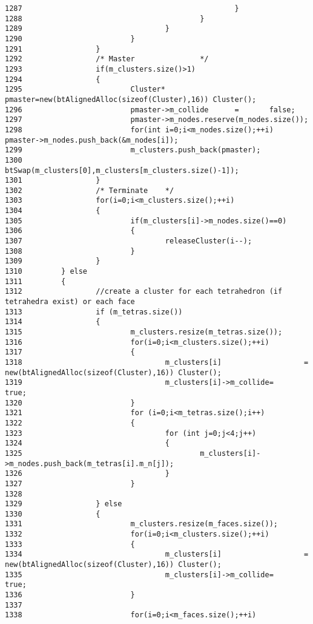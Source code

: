 \begin{Code}
\begin{verbatim}
1287                                                 }
1288                                         }
1289                                 }
1290                         }
1291                 }
1292                 /* Master               */ 
1293                 if(m_clusters.size()>1)
1294                 {
1295                         Cluster*        pmaster=new(btAlignedAlloc(sizeof(Cluster),16)) Cluster();
1296                         pmaster->m_collide      =       false;
1297                         pmaster->m_nodes.reserve(m_nodes.size());
1298                         for(int i=0;i<m_nodes.size();++i) pmaster->m_nodes.push_back(&m_nodes[i]);
1299                         m_clusters.push_back(pmaster);
1300                         btSwap(m_clusters[0],m_clusters[m_clusters.size()-1]);
1301                 }
1302                 /* Terminate    */ 
1303                 for(i=0;i<m_clusters.size();++i)
1304                 {
1305                         if(m_clusters[i]->m_nodes.size()==0)
1306                         {
1307                                 releaseCluster(i--);
1308                         }
1309                 }
1310         } else
1311         {
1312                 //create a cluster for each tetrahedron (if tetrahedra exist) or each face
1313                 if (m_tetras.size())
1314                 {
1315                         m_clusters.resize(m_tetras.size());
1316                         for(i=0;i<m_clusters.size();++i)
1317                         {
1318                                 m_clusters[i]                   =       new(btAlignedAlloc(sizeof(Cluster),16)) Cluster();
1319                                 m_clusters[i]->m_collide=       true;
1320                         }
1321                         for (i=0;i<m_tetras.size();i++)
1322                         {
1323                                 for (int j=0;j<4;j++)
1324                                 {
1325                                         m_clusters[i]->m_nodes.push_back(m_tetras[i].m_n[j]);
1326                                 }
1327                         }
1328 
1329                 } else
1330                 {
1331                         m_clusters.resize(m_faces.size());
1332                         for(i=0;i<m_clusters.size();++i)
1333                         {
1334                                 m_clusters[i]                   =       new(btAlignedAlloc(sizeof(Cluster),16)) Cluster();
1335                                 m_clusters[i]->m_collide=       true;
1336                         }
1337 
1338                         for(i=0;i<m_faces.size();++i)

\end{verbatim}
\end{Code}
